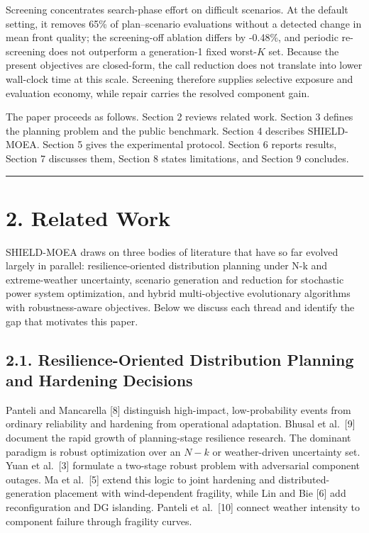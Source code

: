 \documentclass[
  10pt,
  a4paper,
]{article}
\begin{document}
Screening concentrates search-phase effort on difficult scenarios. At
the default setting, it removes 65\% of plan--scenario evaluations
without a detected change in mean front quality; the screening-off
ablation differs by -0.48\%, and periodic re-screening does not
outperform a generation-1 fixed worst-\(K\) set. Because the present
objectives are closed-form, the call reduction does not translate into
lower wall-clock time at this scale. Screening therefore supplies
selective exposure and evaluation economy, while repair carries the
resolved component gain.

The paper proceeds as follows. Section 2 reviews related work. Section 3
defines the planning problem and the public benchmark. Section 4
describes SHIELD-MOEA. Section 5 gives the experimental protocol.
Section 6 reports results, Section 7 discusses them, Section 8 states
limitations, and Section 9 concludes.

\begin{center}\rule{0.5\linewidth}{0.5pt}\end{center}

\section{2. Related Work}\label{related-work}

SHIELD-MOEA draws on three bodies of literature that have so far evolved
largely in parallel: resilience-oriented distribution planning under N-k
and extreme-weather uncertainty, scenario generation and reduction for
stochastic power system optimization, and hybrid multi-objective
evolutionary algorithms with robustness-aware objectives. Below we
discuss each thread and identify the gap that motivates this paper.

\subsection{2.1. Resilience-Oriented Distribution Planning and Hardening
Decisions}\label{resilience-oriented-distribution-planning-and-hardening-decisions}

Panteli and Mancarella {[}8{]} distinguish high-impact, low-probability
events from ordinary reliability and hardening from operational
adaptation. Bhusal et al.~{[}9{]} document the rapid growth of
planning-stage resilience research. The dominant paradigm is robust
optimization over an \(N-k\) or weather-driven uncertainty set. Yuan et
al.~{[}3{]} formulate a two-stage robust problem with adversarial
component outages. Ma et al.~{[}5{]} extend this logic to joint
hardening and distributed-generation placement with wind-dependent
fragility, while Lin and Bie {[}6{]} add reconfiguration and DG
islanding. Panteli et al.~{[}10{]} connect weather intensity to
component failure through fragility curves.
\end{document}
